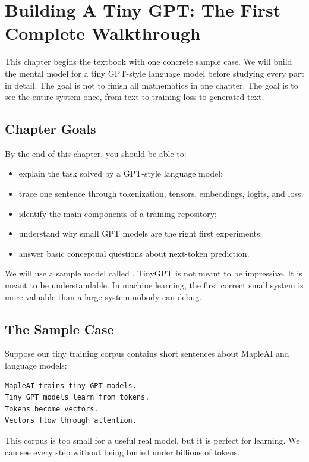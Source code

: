 \chapter{Building A Tiny GPT: The First Complete Walkthrough}

This chapter begins the textbook with one concrete sample case. We will build the mental model for a tiny GPT-style language model before studying every part in detail. The goal is not to finish all mathematics in one chapter. The goal is to see the entire system once, from text to training loss to generated text.

\section{Chapter Goals}

By the end of this chapter, you should be able to:

\begin{itemize}
  \item explain the task solved by a GPT-style language model;
  \item trace one sentence through tokenization, tensors, embeddings, logits, and loss;
  \item identify the main components of a training repository;
  \item understand why small GPT models are the right first experiments;
  \item answer basic conceptual questions about next-token prediction.
\end{itemize}

We will use a sample model called . TinyGPT is not meant to be impressive. It is meant to be understandable. In machine learning, the first correct small system is more valuable than a large system nobody can debug.

\section{The Sample Case}

Suppose our tiny training corpus contains short sentences about MapleAI and language models:

\begin{lstlisting}
MapleAI trains tiny GPT models.
Tiny GPT models learn from tokens.
Tokens become vectors.
Vectors flow through attention.
\end{lstlisting}

This corpus is too small for a useful real model, but it is perfect for learning. We can see every step without being buried under billions of tokens.

